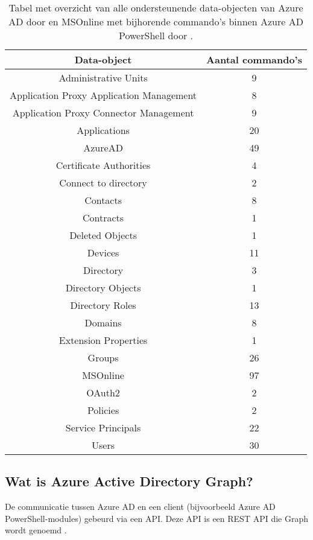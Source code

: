 \begin{table}
    \small
    \centering
    \begin{tabular}{ |c|c| } 
        \hline
        \textbf{Data-object} & \textbf{Aantal commando's} \\
        \hline
        Administrative Units & 9 \\ 
        Application Proxy Application Management & 8 \\ 
        Application Proxy Connector Management & 9 \\
        Applications & 20 \\ 
        AzureAD & 49 \\ 
        Certificate Authorities & 4 \\ 
        Connect to directory & 2 \\ 
        Contacts & 8 \\ 
        Contracts & 1 \\ 
        Deleted Objects & 1 \\ 
        Devices & 11 \\    
        Directory & 3 \\
        Directory Objects & 1 \\ 
        Directory Roles & 13 \\ 
        Domains & 8 \\ 
        Extension Properties & 1 \\ 
        Groups & 26 \\ 
        MSOnline & 97 \\
        OAuth2 & 2 \\ 
        Policies & 2 \\ 
        Service Principals & 22 \\ 
        Users & 30 \\ 
        \hline
    \end{tabular}
    \caption[Tabel Azure AD en MSonline data-objecten]{Tabel met overzicht van alle ondersteunende data-objecten van Azure \ac{AD} door \textcite{Microsoft2023i} en MSOnline met bijhorende commando's binnen Azure \ac{AD} PowerShell door \textcite{Microsofta}.}
    \label{AADT}
\end{table}

\subsection{Wat is Azure Active Directory Graph?}

De communicatie tussen Azure \ac{AD} en een client (bijvoorbeeld Azure \ac{AD} PowerShell-modules) gebeurd via een \ac{API}. Deze \ac{API} is een \ac{REST} \ac{API} die Graph wordt genoemd \autocite{Microsoft2015}. \\ 

